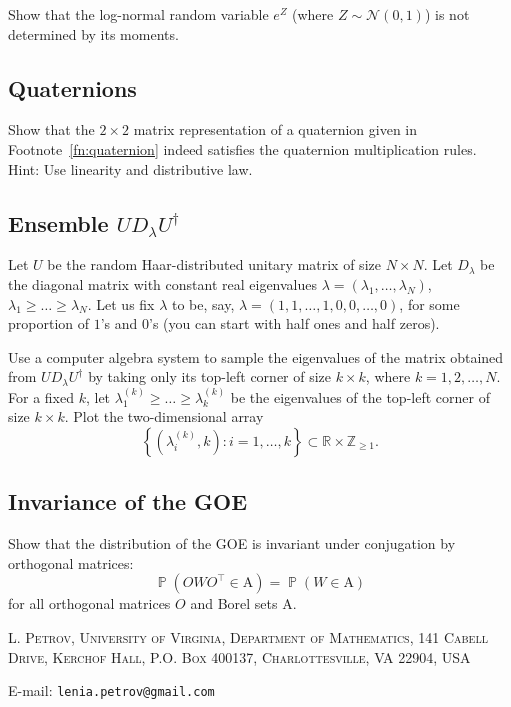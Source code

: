 \documentclass[letterpaper,11pt,oneside,reqno]{article}
\numberwithin{equation}{section}
\theoremstyle{definition}
\begin{document}
Show that the log-normal random variable
$e^{Z}$ (where $Z\sim \mathcal{N}(0,1)$)
is not determined by its moments.

\subsection{Quaternions}

Show that the $2\times 2$ matrix representation of a quaternion
given in Footnote~\ref{fn:quaternion}
indeed satisfies the quaternion multiplication rules.
Hint: Use linearity and distributive law.

\subsection{Ensemble $UD_\lambda U^\dagger$}

Let $U$ be the random Haar-distributed unitary matrix of size $N\times N$.
Let $D_\lambda$ be the diagonal matrix with constant real eigenvalues
$\lambda=(\lambda_1,\ldots,\lambda_N)$,
$\lambda_1\ge \ldots\ge \lambda_N$.
Let us fix $\lambda$ to be, say, $\lambda=(1,1,\ldots,1,0,0,\ldots,0  )$,
for some proportion of $1$'s and $0$'s (you can start with half
ones and half zeros).

Use a computer algebra system to
sample the eigenvalues of the matrix
obtained from $UD_\lambda U^\dagger$
by taking only its top-left corner of size $k\times k$,
where $k=1,2,\ldots,N $.
For a fixed $k$, let
$\lambda_1^{(k)}\ge \ldots\ge \lambda_k^{(k)}$
be the eigenvalues of the top-left corner of size $k\times k$.
Plot the two-dimensional array
\begin{equation*}
	\left\{ (\lambda_i^{(k)},k)\colon i=1,\ldots,k  \right\}\subset \mathbb{R}\times
	\mathbb{Z}_{\ge1}.
\end{equation*}

\subsection{Invariance of the GOE}

Show that the distribution of the GOE is invariant under
conjugation by orthogonal matrices:
\begin{equation*}
	\operatorname{\mathbb{P}}(O W O^\top \in \mathrm{A}) = \operatorname{\mathbb{P}}(W \in \mathrm{A})
\end{equation*}
for all orthogonal matrices $O$ and Borel sets $\mathrm{A}$.








\medskip

\textsc{L. Petrov, University of Virginia, Department of Mathematics, 141 Cabell Drive, Kerchof Hall, P.O. Box 400137, Charlottesville, VA 22904, USA}

E-mail: \texttt{lenia.petrov@gmail.com}
\end{document}
